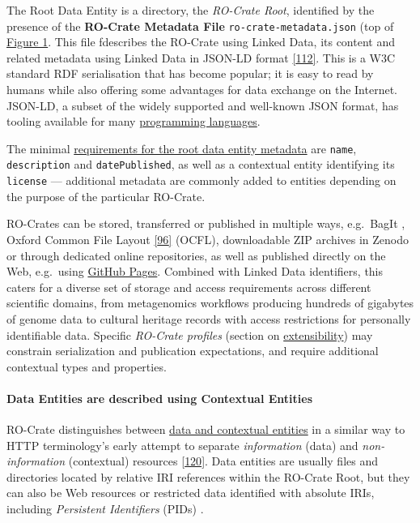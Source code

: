 {The Root Data Entity is a directory, the \emph{RO-Crate Root},
identified by the presence of the \textbf{RO-Crate Metadata File}
\texttt{ro-crate-metadata.json} (top of
\protect\hyperlink{fig:conceptual}{Figure 1}. This file fdescribes the
RO-Crate using Linked Data, its content and related metadata using
Linked Data in JSON-LD format
\href{https://www.w3.org/TR/2014/REC-json-ld-20140116/}{{[}112{]}}. This
is a W3C standard RDF serialisation that has become popular; it is easy
to read by humans while also offering some advantages for data exchange
on the Internet. JSON-LD, a subset of the widely supported and
well-known JSON format, has tooling available for many
\href{https://json-ld.org/\#developers}{programming languages}.

The minimal
\href{https://www.researchobject.org/ro-crate/1.1/root-data-entity.html\#direct-properties-of-the-root-data-entity}{requirements
for the root data entity metadata} are \texttt{name},
\texttt{description} and \texttt{datePublished}, as well as a contextual
entity identifying its \texttt{license} --- additional metadata are
commonly added to entities depending on the purpose of the particular
RO-Crate.

RO-Crates can be stored, transferred or published in multiple ways,
e.g.~BagIt \cite{ch5-74}, Oxford
Common File Layout \href{https://ocfl.io/1.0/spec/}{{[}96{]}} (OCFL),
downloadable ZIP archives in Zenodo or through dedicated online
repositories, as well as published directly on the Web, e.g.~using
\href{https://pages.github.com/}{GitHub Pages}. Combined with Linked
Data identifiers, this caters for a diverse set of storage and access
requirements across different scientific domains, from metagenomics
workflows producing hundreds of gigabytes of genome data to cultural
heritage records with access restrictions for personally identifiable
data. Specific \emph{RO-Crate profiles} (section on
\protect\hyperlink{profiles}{extensibility}) may constrain serialization
and publication expectations, and require additional contextual types
and properties.

\hypertarget{contextualentities}{%
\paragraph{Data Entities are described using Contextual
Entities}\label{contextualentities}}

RO-Crate distinguishes between
\href{https://www.researchobject.org/ro-crate/1.1/contextual-entities.html\#contextual-vs-data-entities}{data
and contextual entities} in a similar way to HTTP terminology's early
attempt to separate \emph{information} (data) and \emph{non-information}
(contextual) resources
\href{https://www.w3.org/2001/tag/doc/httpRange-14/2007-08-31/HttpRange-14.html}{{[}120{]}}.
Data entities are usually files and directories located by relative IRI
references within the RO-Crate Root, but they can also be Web resources
or restricted data identified with absolute IRIs, including
\emph{Persistent Identifiers} (PIDs)
\cite{ch5-86}.

}
